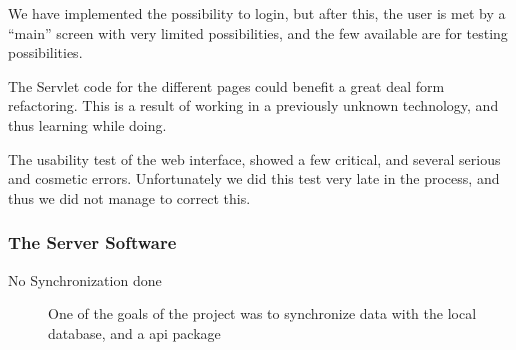 We have implemented the possibility to login, but after this, the user is met by a ``main'' screen with very limited possibilities, and the few available are for testing possibilities.

The Servlet code for the different pages could benefit a great deal form refactoring. This is a result of working in a previously unknown technology, and thus learning while doing.

The usability test of the web interface, showed a few critical, and several serious and cosmetic errors. Unfortunately we did this test very late in the process, and thus we did not manage to correct this.
	

\subsubsection*{The Server Software}
\begin{description}
 \item[No Synchronization done] One of the goals of the project was to synchronize data with the local database, and a api package 
\end{description}



